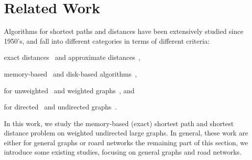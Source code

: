 \section{Related Work}
\label{sec-related}

Algorithms for shortest  paths and distances have been extensively studied since 1950's, and fall into different categories in terms of different criteria:

 \bi
 \item exact distances~\cite{WuXDCZZ12,Dijkstra59,FredmanT84,LubyR89,GeisbergerSSD08,SankaranarayananSA09,SandersS05,GoldbergH05,MozesS12,ChengKCC12,MozesS12,ChanL07,SaundersT07,WagnerW07,bast2014route,delling2014robust,arz2013transit,zhu2013shortest,klein2010shortest,fakcharoenphol2006planar,gupta2004roads}
     and approximate distances~\cite{PotamiasBCG09,SarmaGNP10,ThorupZ05,SankaranarayananS10},


 \item memory-based~\cite{PotamiasBCG09,SarmaGNP10,WuXDCZZ12,Dijkstra59,FredmanT84,LubyR89,GeisbergerSSD08,Wei10,SankaranarayananSA09,SandersS05,
ThorupZ05,MozesS12,SaundersT07,WagnerW07,bast2014route,delling2014robust,arz2013transit,SankaranarayananS10,zhu2013shortest,klein2010shortest,gupta2004roads} and disk-based algorithms~\cite{ChengKCC12,ChanL07},


 \item for unweighted~\cite{PotamiasBCG09,SarmaGNP10,Wei10,bast2014route,delling2014robust,arz2013transit} and weighted graphs~\cite{WuXDCZZ12,Dijkstra59,FredmanT84,LubyR89,GeisbergerSSD08,SankaranarayananSA09,GoldbergH05,MozesS12,SandersS05,ChengKCC12,ThorupZ05,MozesS12,ChanL07,SaundersT07,WagnerW07,bast2014route,delling2014robust,arz2013transit,SankaranarayananS10,zhu2013shortest,klein2010shortest,fakcharoenphol2006planar,gupta2004roads},
     and


 \item for directed~\cite{SaundersT07,GoldbergH05,MozesS12,bast2014route,delling2014robust,arz2013transit,zhu2013shortest,klein2010shortest,fakcharoenphol2006planar} and undirected graphs~\cite{PotamiasBCG09,SarmaGNP10,WuXDCZZ12,Dijkstra59,FredmanT84,LubyR89,GeisbergerSSD08,Wei10,SankaranarayananSA09,SandersS05,ChengKCC12,ThorupZ05,MozesS12,ChanL07,WagnerW07,bast2014route,delling2014robust,arz2013transit,SankaranarayananS10,gupta2004roads}.
 \ei


In this work, we study the memory-based (exact)  shortest path and shortest distance problem on weighted undirected large graphs. In general, these work are either for general graphs or roard networks the remaining part of this section, we introduce some existing studies, focusing on general graphs and road networks.

